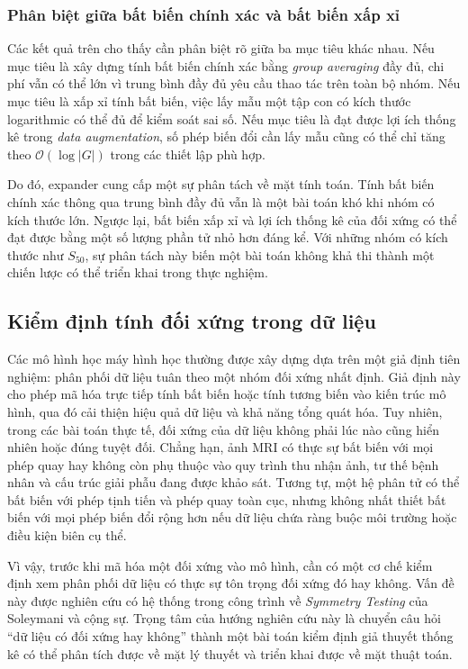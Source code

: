 \subsubsection{Phân biệt giữa bất biến chính xác và bất biến xấp xỉ}

Các kết quả trên cho thấy cần phân biệt rõ giữa ba mục tiêu khác nhau. Nếu mục tiêu là xây dựng tính bất biến chính xác bằng \textit{group averaging} đầy đủ, chi phí vẫn có thể lớn vì trung bình đầy đủ yêu cầu thao tác trên toàn bộ nhóm. Nếu mục tiêu là xấp xỉ tính bất biến, việc lấy mẫu một tập con có kích thước logarithmic có thể đủ để kiểm soát sai số. Nếu mục tiêu là đạt được lợi ích thống kê trong \textit{data augmentation}, số phép biến đổi cần lấy mẫu cũng có thể chỉ tăng theo $\mathcal{O}(\log |G|)$ trong các thiết lập phù hợp.

Do đó, expander cung cấp một sự phân tách về mặt tính toán. Tính bất biến chính xác thông qua trung bình đầy đủ vẫn là một bài toán khó khi nhóm có kích thước lớn. Ngược lại, bất biến xấp xỉ và lợi ích thống kê của đối xứng có thể đạt được bằng một số lượng phần tử nhỏ hơn đáng kể. Với những nhóm có kích thước như $S_{50}$, sự phân tách này biến một bài toán không khả thi thành một chiến lược có thể triển khai trong thực nghiệm.

\subsection{Kiểm định tính đối xứng trong dữ liệu}
\label{subsec:symmetry-testing}

Các mô hình học máy hình học thường được xây dựng dựa trên một giả định tiên nghiệm: phân phối dữ liệu tuân theo một nhóm đối xứng nhất định. Giả định này cho phép mã hóa trực tiếp tính bất biến hoặc tính tương biến vào kiến trúc mô hình, qua đó cải thiện hiệu quả dữ liệu và khả năng tổng quát hóa. Tuy nhiên, trong các bài toán thực tế, đối xứng của dữ liệu không phải lúc nào cũng hiển nhiên hoặc đúng tuyệt đối. Chẳng hạn, ảnh MRI có thực sự bất biến với mọi phép quay hay không còn phụ thuộc vào quy trình thu nhận ảnh, tư thế bệnh nhân và cấu trúc giải phẫu đang được khảo sát. Tương tự, một hệ phân tử có thể bất biến với phép tịnh tiến và phép quay toàn cục, nhưng không nhất thiết bất biến với mọi phép biến đổi rộng hơn nếu dữ liệu chứa ràng buộc môi trường hoặc điều kiện biên cụ thể.

Vì vậy, trước khi mã hóa một đối xứng vào mô hình, cần có một cơ chế kiểm định xem phân phối dữ liệu có thực sự tôn trọng đối xứng đó hay không. Vấn đề này được nghiên cứu có hệ thống trong công trình về \textit{Symmetry Testing} của Soleymani và cộng sự. Trọng tâm của hướng nghiên cứu này là chuyển câu hỏi ``dữ liệu có đối xứng hay không'' thành một bài toán kiểm định giả thuyết thống kê có thể phân tích được về mặt lý thuyết và triển khai được về mặt thuật toán.

